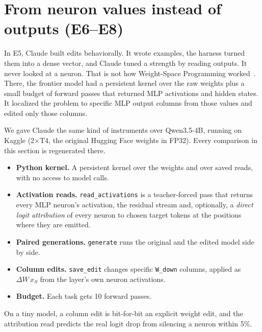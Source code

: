\section{From neuron values instead of outputs (E6--E8)}
\label{sec:wsp}
In E5, Claude built edits behaviorally. It wrote examples, the harness turned them into a dense vector, and Claude tuned a strength by reading outputs. It never looked at a neuron. That is not how Weight-Space Programming worked~\cite{takehi2026wsp}. There, the frontier model had a persistent kernel over the raw weights plus a small budget of forward passes that returned MLP activations and hidden states. It localized the problem to specific MLP output columns from those values and edited only those columns.

We gave Claude the same kind of instruments over Qwen3.5-4B, running on Kaggle (2$\times$T4, the original Hugging Face weights in FP32). Every comparison in this section is regenerated there.
\begin{itemize}
\item \textbf{Python kernel.} A persistent kernel over the weights and over saved reads, with no access to model calls.
\item \textbf{Activation reads.} \texttt{read\_activations} is a teacher-forced pass that returns every MLP neuron's activation, the residual stream and, optionally, a \emph{direct logit attribution} of every neuron to chosen target tokens at the positions where they are emitted.
\item \textbf{Paired generations.} \texttt{generate} runs the original and the edited model side by side.
\item \textbf{Column edits.} \texttt{save\_edit} changes specific \texttt{W\_down} columns, applied as $\Delta W\,x_S$ from the layer's own neuron activations.
\item \textbf{Budget.} Each task gets 10 forward passes.
\end{itemize}
On a tiny model, a column edit is bit-for-bit an explicit weight edit, and the attribution read predicts the real logit drop from silencing a neuron within 5\%.




